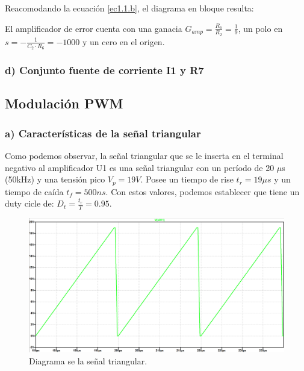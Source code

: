 \documentclass[e4_tp2_main.tex]{subfiles}
\begin{document}
Reacomodando la ecuaci\'on \eqref{ec1.1.b}, el diagrama en bloque resulta: 

\begin{center}
\end{center}


El amplificador de error cuenta con una ganacia $G_{amp}=\frac{R_6}{R_2} =\frac{1}{9}$, un polo en $s=-\frac{1}{C_2 \cdot R_6 }=-1000$ y un cero en el origen.


\subsubsection*{d) Conjunto fuente de corriente I1 y R7}


\subsection{Modulaci\'on PWM}


\subsubsection*{a) Caracter\'isticas de la se\~nal triangular}
Como podemos observar, la señal triangular que se le inserta en el terminal negativo al amplificador U1 es una señal triangular con un período de 20 $\mu $s (50kHz) y una tensión pico $V_p=19 V$. Posee un tiempo de rise $t_r=19 \mu s$ y un tiempo de caída $t_f=500ns$. Con estos valores, podemos establecer que tiene un duty cicle de: $D_t= \frac{t_r}{T}=0.95$. 
\begin{figure}[H]
\centering
\includegraphics[width=0.5\linewidth]{Imagenes/Punto1/triang_shape.png}
\caption{Diagrama se la señal triangular.}
\end{figure}
\end{document}
